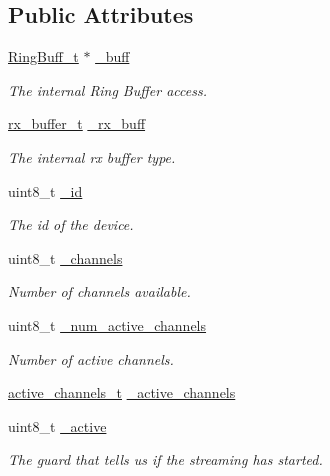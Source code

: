 \subsection*{\-Public \-Attributes}
\begin{DoxyCompactItemize}
\item 
\hyperlink{struct_ring_buff__t}{\-Ring\-Buff\-\_\-t} $\ast$ \hyperlink{class_a_d_s1298___driver_ac53513e960f78b5ca0713288e410d7d8}{\-\_\-buff}
\begin{DoxyCompactList}\small\item\em \-The internal \-Ring \-Buffer access. \end{DoxyCompactList}\item 
\hyperlink{structrx__buffer__t}{rx\-\_\-buffer\-\_\-t} \hyperlink{class_a_d_s1298___driver_ab7156a79b770bfa6d44e753e5d81ceb7}{\-\_\-rx\-\_\-buff}
\begin{DoxyCompactList}\small\item\em \-The internal rx buffer type. \end{DoxyCompactList}\item 
uint8\-\_\-t \hyperlink{class_a_d_s1298___driver_ae61d4626ed0d4fbd566a5a80baa69da6}{\-\_\-id}
\begin{DoxyCompactList}\small\item\em \-The id of the device. \end{DoxyCompactList}\item 
uint8\-\_\-t \hyperlink{class_a_d_s1298___driver_a3f9749dd1e5189a86a513dd654a2bd56}{\-\_\-channels}
\begin{DoxyCompactList}\small\item\em \-Number of channels available. \end{DoxyCompactList}\item 
uint8\-\_\-t \hyperlink{class_a_d_s1298___driver_adffccf9bfd40ec402181967dd2a6291f}{\-\_\-num\-\_\-active\-\_\-channels}
\begin{DoxyCompactList}\small\item\em \-Number of active channels. \end{DoxyCompactList}\item 
\hyperlink{structactive__channels__t}{active\-\_\-channels\-\_\-t} \hyperlink{class_a_d_s1298___driver_ab8a50f10e853ff7cc5a79ac92f724345}{\-\_\-active\-\_\-channels}
\item 
uint8\-\_\-t \hyperlink{class_a_d_s1298___driver_a957aac836bd2d6506a971bcb72cf6de7}{\-\_\-active}
\begin{DoxyCompactList}\small\item\em \-The guard that tells us if the streaming has started. \end{DoxyCompactList}\end{DoxyCompactItemize}


